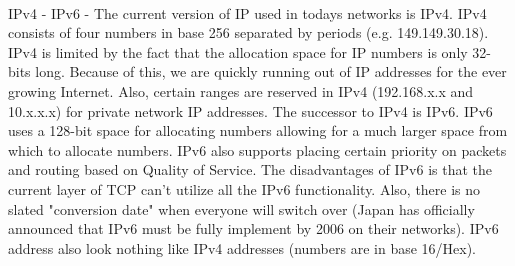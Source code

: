 \documentclass[a4paper,11pt]{article}
\begin{document}
\paragraph{}IPv4 - IPv6 - The current version of IP used in todays networks is IPv4. IPv4 consists of four numbers in base 256 separated by periods (e.g. 149.149.30.18). IPv4 is limited by the fact that the allocation space for IP numbers is only 32-bits long. Because of this, we are quickly running out of IP addresses for the ever growing Internet. Also, certain ranges are reserved in IPv4 (192.168.x.x and 10.x.x.x) for private network IP addresses. The successor to IPv4 is IPv6. IPv6 uses a 128-bit space for allocating numbers allowing for a much larger space from which to allocate numbers. IPv6 also supports placing certain priority on packets and routing based on Quality of Service. The disadvantages of IPv6 is that the current layer of TCP can't utilize all the IPv6 functionality. Also, there is no slated "conversion date" when everyone will switch over (Japan has officially announced that IPv6 must be fully implement by 2006 on their networks). IPv6 address also look nothing like IPv4 addresses (numbers are in base 16/Hex).
\end{document}
